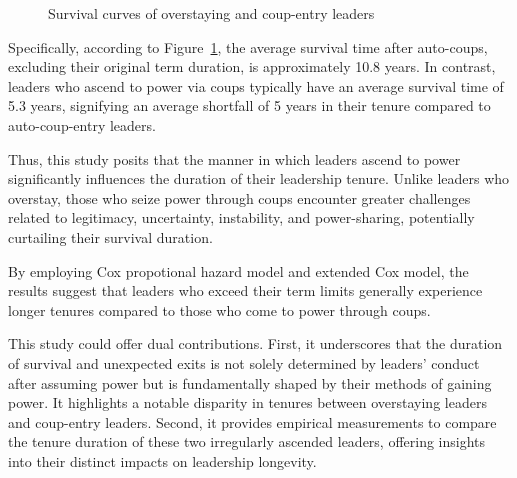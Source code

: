 \documentclass[
  12pt,
  a4paper,
  12pt]{article}
\begin{document}
\begin{figure}


\caption{\label{fig-logrank}Survival curves of overstaying and
coup-entry leaders}

\end{figure}%

Specifically, according to Figure~\ref{fig-logrank}, the average
survival time after auto-coups, excluding their original term duration,
is approximately 10.8 years. In contrast, leaders who ascend to power
via coups typically have an average survival time of 5.3 years,
signifying an average shortfall of 5 years in their tenure compared to
auto-coup-entry leaders.

Thus, this study posits that the manner in which leaders ascend to power
significantly influences the duration of their leadership tenure. Unlike
leaders who overstay, those who seize power through coups encounter
greater challenges related to legitimacy, uncertainty, instability, and
power-sharing, potentially curtailing their survival duration.

By employing Cox propotional hazard model and extended Cox model, the
results suggest that leaders who exceed their term limits generally
experience longer tenures compared to those who come to power through
coups.

This study could offer dual contributions. First, it underscores that
the duration of survival and unexpected exits is not solely determined
by leaders' conduct after assuming power but is fundamentally shaped by
their methods of gaining power. It highlights a notable disparity in
tenures between overstaying leaders and coup-entry leaders. Second, it
provides empirical measurements to compare the tenure duration of these
two irregularly ascended leaders, offering insights into their distinct
impacts on leadership longevity.
\end{document}
